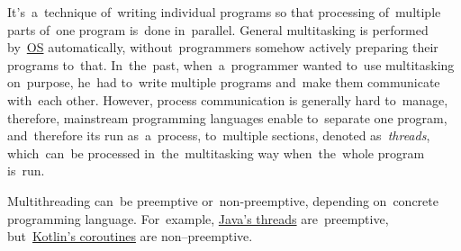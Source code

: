 \label{multithreading}
It's~a~technique of~writing individual programs so that processing of~multiple parts of~one program is~done in~parallel.
General multitasking is performed by~\hyperref[os]{OS} automatically, without~programmers somehow actively preparing their programs to~that.
In~the~past, when~a~programmer wanted to~use multitasking on~purpose, he~had to~write multiple programs and~make them communicate with~each other.
However, process communication is generally hard to~manage, therefore, mainstream programming languages enable to~separate one program, and~therefore its run as~a~process, to~multiple sections, denoted \mbox{as \textit{threads}}, which~can~be processed in~the~multitasking way when~the~whole program is~run.

Multithreading can~be preemptive or~non-preemptive, depending on~concrete programming language.
For~example, \hyperref[javathread]{Java's threads} are~preemptive, but~\hyperref[kotlincoroutine]{Kotlin's coroutines} are non--preemptive.
